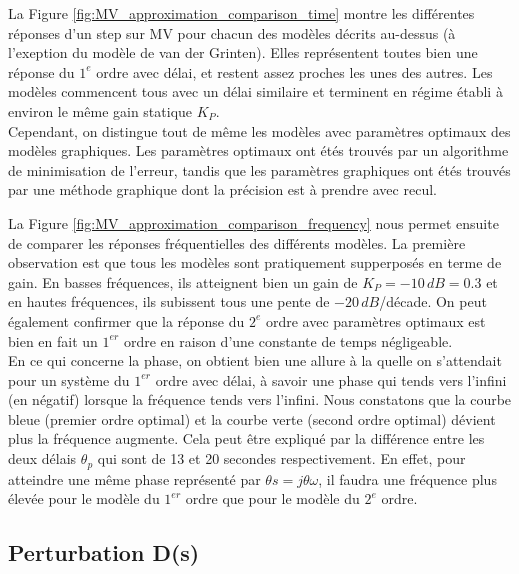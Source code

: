 La Figure \ref{fig:MV_approximation_comparison_time} montre les différentes réponses d'un step sur MV pour chacun des modèles décrits au-dessus (à l'exeption du modèle de van der Grinten).
Elles représentent toutes bien une réponse du $1^{e}$ ordre avec délai, et restent assez proches les unes des autres.
Les modèles commencent tous avec un délai similaire et terminent en régime établi à environ le même gain statique $K_P$.\\
Cependant, on distingue tout de même les modèles avec paramètres optimaux des modèles graphiques.
Les paramètres optimaux ont étés trouvés par un algorithme de minimisation de l'erreur, tandis que les paramètres graphiques ont étés trouvés par une méthode graphique dont la précision est à prendre avec recul.
\par
La Figure \ref{fig:MV_approximation_comparison_frequency} nous permet ensuite de comparer les réponses fréquentielles des différents modèles.
La première observation est que tous les modèles sont pratiquement supperposés en terme de gain.
En basses fréquences, ils atteignent bien un gain de $K_P = -10\,dB = 0.3$ et en hautes fréquences, ils subissent tous une pente de $-20\,dB$/décade.
On peut également confirmer que la réponse du $2^{e}$ ordre avec paramètres optimaux est bien en fait un $1^{er}$ ordre en raison d'une constante de temps négligeable.\\
En ce qui concerne la phase, on obtient bien une allure à la quelle on s'attendait pour un système du $1^{er}$ ordre avec délai, à savoir une phase qui tends vers l'infini (en négatif) lorsque la fréquence tends vers l'infini.
Nous constatons que la courbe bleue (premier ordre optimal) et la courbe verte (second ordre optimal) dévient plus la fréquence augmente. Cela peut être expliqué par la différence entre les deux délais $\theta_p$ qui sont de 13 et 20 secondes respectivement.
En effet, pour atteindre une même phase représenté par $\theta s = j\theta\omega$, il faudra une fréquence plus élevée pour le modèle du $1^{er}$ ordre que pour le modèle du $2^{e}$ ordre. 

\subsection{Perturbation D(s)}

